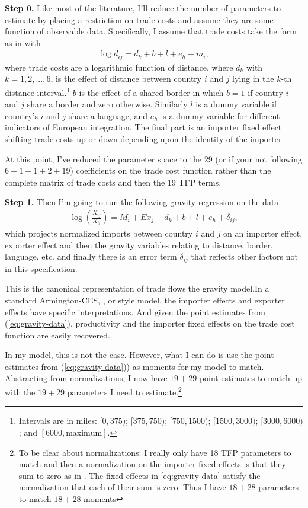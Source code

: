 \documentclass[12pt,pdftex]{article}
\begin{document}
\begin{onehalfspacing}
\textbf{Step 0.} Like most of the literature, I'll reduce the number of parameters to estimate by placing a restriction on trade costs and assume they are some function of observable data.  Specifically, I assume that trade costs take the form as in \citet{eaton2002technology} with
\begin{align}
\log d_{ij} = d_{k} + b + l + e_{h} + m_{i},
\label{eq:trade-cost-function}
\end{align}
where trade costs are a logarithmic function of distance, where $d_k$ with $k = 1,2,...,6$, is the effect of distance between country $i$ and $j$ lying in the $k$-th distance interval.\footnote{Intervals are in miles: $[0,375)$; $[375,750)$; $[750,1500)$; $[1500,3000)$; $[3000,6000)$; and $[6000,\mbox{maximum}]$. } $b$ is the effect of a shared border in which $b =1$ if country $i$ and $j$ share a border and zero otherwise. Similarly $l$ is a dummy variable if country's $i$ and $j$ share a language, and $e_{h}$ is a dummy variable for different indicators of European integration. The final part is an importer fixed effect shifting trade costs up or down depending upon the identity of the importer.

At this point, I've reduced the parameter space to the $29$ (or if your not following $6 + 1 + 1 + 2 + 19$) coefficients on the trade cost function rather than the complete matrix of trade costs and then the 19 TFP terms.

\textbf{Step 1.} Then I'm going to run the following gravity regression on the data
\begin{align}
\log \left( {\frac{X_{ij}}{X_{ii}}} \right) = {M_{i}} + {Ex_{j}} + {d_{k}} + {b} + {l} + {e_{h}} + \delta_{ij},
\label{eq:gravity-data}
\end{align}
which projects normalized imports between country $i$ and $j$ on an importer effect, exporter effect and then the gravity variables relating to distance, border, language, etc. and finally there is an error term $\delta_{ij}$ that reflects other factors not in this specification.

This is the canonical representation of trade flows|the gravity model.In a standard Armington-CES, \citet{eaton2002technology}, or \citet{melitz2003impact} style model, the importer effects and exporter effects have specific interpretations. And given the point estimates from (\ref{eq:gravity-data}), productivity and the importer fixed effects on the trade cost function are easily recovered.

In my model, this is not the case. However, what I can do is use the point estimates from (\ref{eq:gravity-data})) as moments for my model to match. Abstracting from normalizations, I now have $19 + 29$ point estimates to match up with the $19 + 29$ parameters I need to estimate.\footnote{To be clear about normalizations: I really only have 18 TFP parameters to match and then a normalization on the importer fixed effects is that they sum to zero as in \citet{eaton2002technology}. The fixed effects in \ref{eq:gravity-data} satisfy the normalization that each of their sum is zero. Thus I have $18 + 28$ parameters to match $18 + 28$ moments}


\end{onehalfspacing}
\end{document}

